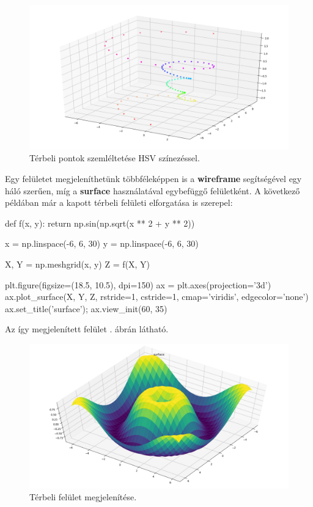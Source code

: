 \begin{figure}[h!]
\centering
\includegraphics[width=\textwidth]{img/curve-3.png}
\caption{Térbeli pontok szemléltetése HSV színezéssel.}
\label{fig:curve-3}
\end{figure}
    
    Egy felületet megjeleníthetünk többféleképpen is a \textbf{wireframe}
segítségével egy háló szerűen, míg a \textbf{surface} használatával
egybefüggő felületként. A következő példában már a kapott térbeli felületi elforgatása is szerepel:
\begin{python}
def f(x, y):
    return np.sin(np.sqrt(x ** 2 + y ** 2))

x = np.linspace(-6, 6, 30)
y = np.linspace(-6, 6, 30)

X, Y = np.meshgrid(x, y)
Z = f(X, Y)

plt.figure(figsize=(18.5, 10.5), dpi=150)
ax = plt.axes(projection='3d')
ax.plot_surface(X, Y, Z, rstride=1, cstride=1,
                cmap='viridis', edgecolor='none')
ax.set_title('surface');
ax.view_init(60, 35)
\end{python}
Az így megjelenített felület . ábrán látható.

\begin{figure}[h!]
\centering
\includegraphics[width=\textwidth]{img/curve-4.png}
\caption{Térbeli felület megjelenítése.}
\label{fig:curve-4}
\end{figure}
    
